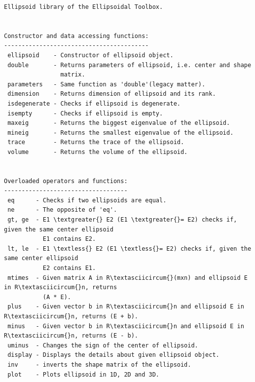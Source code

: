 \documentclass[letterpaper,10pt,english]{sphinxmanual}
\begin{document}
\begin{Verbatim}[commandchars=\\\{\}]
Ellipsoid library of the Ellipsoidal Toolbox.


Constructor and data accessing functions:
-----------------------------------------
 ellipsoid    - Constructor of ellipsoid object.
 double       - Returns parameters of ellipsoid, i.e. center and shape
                matrix.
 parameters   - Same function as 'double'(legacy matter).
 dimension    - Returns dimension of ellipsoid and its rank.
 isdegenerate - Checks if ellipsoid is degenerate.
 isempty      - Checks if ellipsoid is empty.
 maxeig       - Returns the biggest eigenvalue of the ellipsoid.
 mineig       - Returns the smallest eigenvalue of the ellipsoid.
 trace        - Returns the trace of the ellipsoid.
 volume       - Returns the volume of the ellipsoid.


Overloaded operators and functions:
-----------------------------------
 eq      - Checks if two ellipsoids are equal.
 ne      - The opposite of 'eq'.
 gt, ge  - E1 \textgreater{} E2 (E1 \textgreater{}= E2) checks if, given the same center ellipsoid
           E1 contains E2.
 lt, le  - E1 \textless{} E2 (E1 \textless{}= E2) checks if, given the same center ellipsoid
           E2 contains E1.
 mtimes  - Given matrix A in R\textasciicircum{}(mxn) and ellipsoid E in R\textasciicircum{}n, returns
           (A * E).
 plus    - Given vector b in R\textasciicircum{}n and ellipsoid E in R\textasciicircum{}n, returns (E + b).
 minus   - Given vector b in R\textasciicircum{}n and ellipsoid E in R\textasciicircum{}n, returns (E - b).
 uminus  - Changes the sign of the center of ellipsoid.
 display - Displays the details about given ellipsoid object.
 inv     - inverts the shape matrix of the ellipsoid.
 plot    - Plots ellipsoid in 1D, 2D and 3D.



\end{Verbatim}
\end{document}
